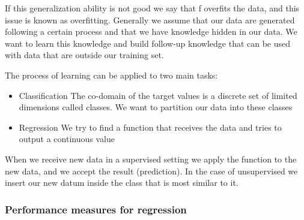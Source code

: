 If this generalization ability is not good we say that f overfits the data, and this issue is known as overfitting. Generally we assume that our data are generated following a certain process and that we have knowledge hidden in our data. We want to learn this knowledge and build follow-up knowledge that can be used with data that are outside our training set. 

\vspace{10pt}

The process of learning can be applied to two main tasks:

\begin{itemize}
    \item Classification \ra The co-domain of the target values is a discrete set of limited dimensions called classes. We want to partition our data into these classes
    \item Regression \ra We try to find a function that receives the data and tries to output a continuous value 
\end{itemize}

\vspace{10pt}

When we receive new data in a supervised setting we apply the function to the new data, and we accept the result (prediction). In the case of unsupervised we insert our new datum inside the class that is most similar to it. 

\subsubsection{Performance measures for regression}

